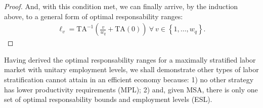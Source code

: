 \documentclass[hidelinks, nonatbib]{elsarticle}
\begin{document}
\begin{lemma}
\begin{proof}
        And, with this condition met, we can finally arrive, by the induction above, to a general form of optimal responsability ranges:
        \begin{gather}
        \ell_v
        =
        \text{TA}^{-1}\left(
            \frac{v}{w_q}
            +
            \text{TA}(0)
        \right)
        \
        \forall
        \
        v \in 
        \left\{
            1, \dots, w_q
        \right\}
        .
        \end{gather}    
    \end{proof}
\end{lemma}

Having derived the optimal responsability ranges for a maximally stratified labor market with unitary employment levels, we shall demonstrate other types of labor stratification cannot attain in an efficient economy because: 1) no other strategy has lower productivity requirements (MPL); 2) and, given MSA, there is only one set of optimal responsability bounds and employment levels (ESL).
\end{document}
